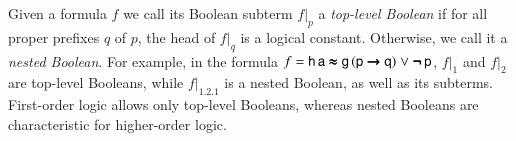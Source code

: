 Given a formula $f$ we call its Boolean subterm $f|_p$ a \emph{top-level
Boolean} if for all proper prefixes $q$ of $p$, the head of $f|_q$ is a logical
constant. Otherwise, we call it a \emph{nested Boolean}. For example, in the formula
$f = \mathsf{h} \, \mathsf{a} \pmb\approx \mathsf{g} \, (\mathsf{p} \pmb\rightarrow \mathsf{q}) \mathrel\lor
\pmb{\neg\,}\mathsf{p}$, $f|_1$ and $f|_2$ are top-level Booleans, while $f|_{1.2.1}$ is
a nested Boolean, as well as its subterms. First-order logic allows only top-level Booleans, whereas nested Booleans are characteristic for
higher-order logic. 

